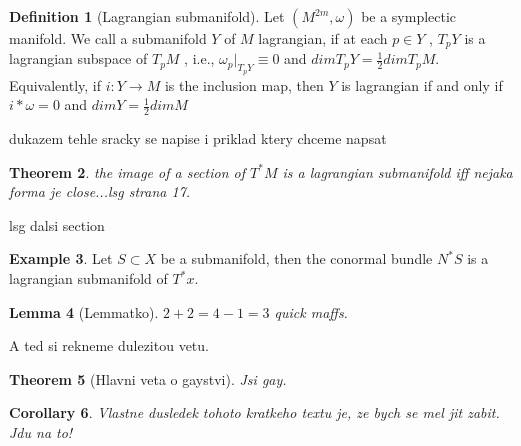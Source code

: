 \documentclass{article}
\newtheorem{theorem}{Theorem}
\newtheorem{lemma}[theorem]{Lemma} %
\newtheorem{corollary}[theorem]{Corollary}
\theoremstyle{definition}
\newtheorem{definition}[theorem]{Definition}
\newtheorem{example}[theorem]{Example}
\begin{document}
\begin{definition}[Lagrangian submanifold]
    Let $(M^{2m},\omega)$ be a symplectic manifold. We call a submanifold $Y$ of $M$ lagrangian, if at each $p \in Y$ , $T_pY$ is a lagrangian
    subspace of $T_pM$ , i.e., $\omega_p|_{T_pY} \equiv 0$ and $dim T_pY = \frac{1}{2} dim T_pM$. 
    Equivalently, if $i : Y \rightarrow M$ is the inclusion map, then $Y$ is lagrangian if and only if $i*\omega = 0$ and $dim Y = \frac{1}{2} dim M$ 
    
\end{definition}

dukazem tehle sracky se napise i priklad ktery chceme napsat 
\begin{theorem}
    the image of a section of $T^*M$ is a lagrangian submanifold iff nejaka forma je close...lsg strana 17.
\end{theorem}

lsg dalsi section
\begin{example}
    Let $S \subset X$ be a submanifold, then the conormal bundle $N^*S$ is a lagrangian submanifold of $T^*x$.
\end{example}

\begin{lemma}[Lemmatko]
$2+2 = 4 - 1 = 3$ quick maffs.
\end{lemma}

A ted si rekneme dulezitou vetu.
\begin{theorem}[Hlavni veta o gaystvi]
Jsi gay.
\end{theorem}


\begin{corollary}
    Vlastne dusledek tohoto kratkeho textu je, ze bych se mel jit zabit. Jdu na to!
\end{corollary}
\end{document}
